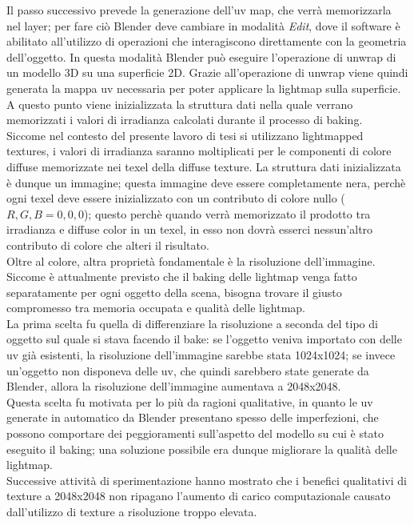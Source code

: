 Il passo successivo prevede la generazione dell’uv map, che verrà  memorizzarla nel layer; per fare ciò Blender deve cambiare in modalità \emph{Edit}, dove il software è abilitato all’utilizzo di operazioni che interagiscono direttamente con la geometria dell’oggetto. In questa modalità Blender può eseguire l’operazione di unwrap di un modello 3D su una superficie 2D. Grazie all’operazione di unwrap viene quindi generata la mappa uv necessaria per poter applicare la lightmap sulla superficie. 
\\
A questo punto viene inizializzata la struttura dati nella quale verrano memorizzati i valori di irradianza calcolati durante il processo di baking.
\\
Siccome nel contesto del presente lavoro di tesi si utilizzano lightmapped textures, i valori di irradianza saranno moltiplicati per le componenti di colore diffuse memorizzate nei texel della diffuse texture. La struttura dati inizializzata è dunque un immagine; questa immagine deve essere completamente nera, perchè ogni texel deve essere inizializzato con un contributo di colore nullo ($R,G,B = 0,0,0$); questo perchè quando verrà memorizzato il prodotto tra irradianza e diffuse color in un texel, in esso non dovrà esserci nessun’altro contributo di colore che alteri il risultato.
\\
Oltre al colore, altra proprietà fondamentale è la risoluzione dell’immagine.
\\
Siccome è attualmente previsto che il baking delle lightmap venga fatto separatamente per ogni oggetto della scena, bisogna trovare il giusto compromesso tra memoria occupata e qualità delle lightmap. 
\\
La prima scelta fu quella di differenziare la risoluzione a seconda del tipo di oggetto sul quale si stava facendo il bake: se l’oggetto veniva importato con delle uv già esistenti, la risoluzione dell’immagine sarebbe stata 1024x1024; se invece un’oggetto non disponeva delle uv, che quindi sarebbero state generate da Blender, allora la risoluzione dell’immagine aumentava a 2048x2048.
\\
Questa scelta fu motivata per lo più da ragioni qualitative, in quanto le uv generate in automatico da Blender presentano spesso delle imperfezioni, che possono comportare dei peggioramenti sull’aspetto del modello su cui è stato eseguito il baking; una soluzione possibile era dunque migliorare la qualità delle lightmap. 
\\
Successive attività di sperimentazione hanno mostrato che i benefici qualitativi di texture a 2048x2048  non ripagano l’aumento di carico computazionale causato dall’utilizzo di texture a risoluzione troppo elevata.
